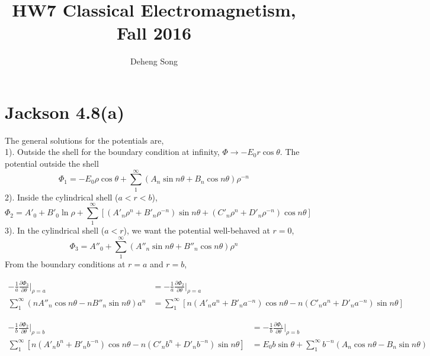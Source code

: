 \documentclass{article}
\newcommand{\pd}[2]{\frac{\partial#1}{\partial#2}}
\begin{document}
\title{HW7 Classical Electromagnetism, Fall 2016}
\author{Deheng Song}
\maketitle

\section*{Jackson 4.8(a)}

The general solutions for the potentials are,\\
1). Outside the shell for the boundary condition at infinity, $\Phi\rightarrow -E_0r\cos\theta$. The potential outside the shell
\[ \Phi_1=-E_0\rho\cos\theta+\sum_1^\infty (A_n\sin n\theta+B_n\cos n\theta)\rho^{-n} \]
2). Inside the cylindrical shell ($a<r<b$),
\[ \Phi_2=A'_0+B'_0\ln\rho+\sum_1^\infty[(A'_n\rho^n+B'_n\rho^{-n})\sin n\theta+(C'_n\rho^n+D'_n\rho^{-n})\cos n\theta] \]
3). In the cylindrical shell ($a<r$), we want the potential well-behaved at $r=0$,
\[ \Phi_3=A''_0+\sum_1^\infty(A''_n\sin n\theta+B''_n\cos n\theta)\rho^n \]
From the boundary conditions at $r=a$ and $r=b$,

\begin{align*}
  -\frac{1}{a}\pd{\Phi_3}{\theta}|_{\rho=a}&=-\frac{1}{a}\pd{\Phi_2}{\theta}|_{\rho=a}\\
  \sum_1^\infty(nA''_n\cos n\theta-nB''_n\sin n\theta)a^n&=\sum_1^\infty[n(A'_na^n+B'_na^{-n})\cos n\theta-n(C'_na^n+D'_na^{-n})\sin n\theta]
\end{align*}

\begin{align*}
  -\frac{1}{b}\pd{\Phi_2}{\theta}|_{\rho=b}&=-\frac{1}{b}\pd{\Phi_1}{\theta}|_{\rho=b}\\
  \sum_1^\infty[n(A'_nb^n+B'_nb^{-n})\cos n\theta-n(C'_nb^n+D'_nb^{-n})\sin n\theta]&=E_0b\sin\theta+\sum_1^\infty b^{-n}(A_n\cos n\theta-B_n\sin n\theta)
\end{align*}
\end{document}
